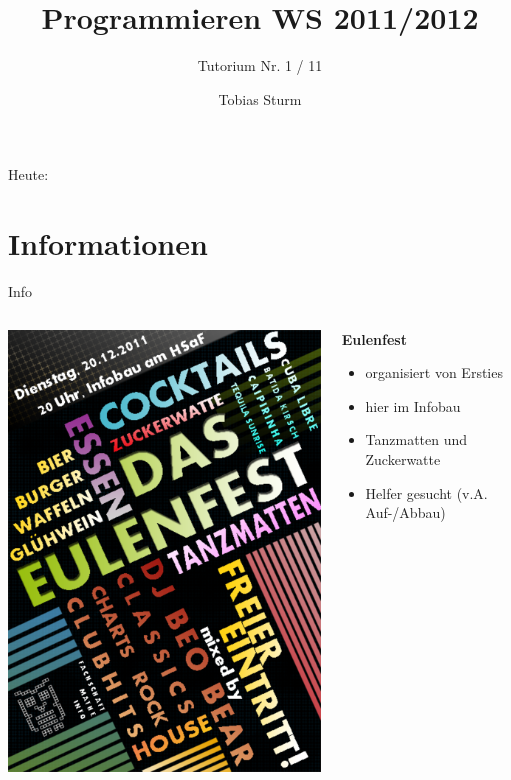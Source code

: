 \documentclass[18pt]{beamer}
\title[Proggen WS11/12]{Programmieren WS 2011/2012}
\subtitle{Tutorium Nr. 1 / 11}
\author{Tobias Sturm} %
\institute{Zertifizierbare Vertrauenswürdige Informatiksysteme}
\date[23.1.12] %
\begin{document}


\begin{frame}
	\titlepage
\end{frame}


\begin{frame}{Heute:}
	\tableofcontents
\end{frame}


\section*{Informationen}
\begin{frame}{Info}
	\begin{columns}[T]
		 \begin{column}{5cm}
			\includegraphics[scale=1.5]{bilder/eulenfest.png}		 
		 \end{column}
 		 \begin{column}{5cm}
			\textbf{Eulenfest}
			\begin{itemize}
				\item organisiert von Ersties
				\item hier im Infobau
				\item Tanzmatten und Zuckerwatte
				\item Helfer gesucht (v.A. Auf-/Abbau)
			\end{itemize}
 		 \end{column}
	\end{columns}
\end{frame}
\end{document}
